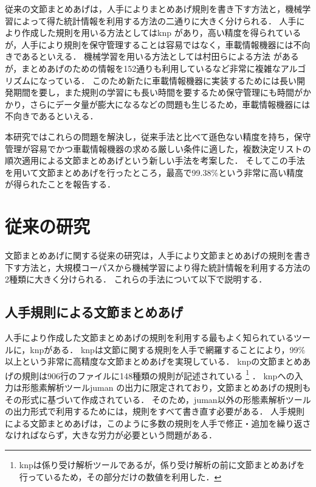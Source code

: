 従来の文節まとめあげは，人手によりまとめあげ規則を書き下す方法と，機械学習によって得た統計情報を利用する方法の二通りに大きく分けられる．
人手により作成した規則を用いる方法としてはknp
\cite{knp2.0b4}
があり，高い精度を得られているが，人手により規則を保守管理することは容易ではなく，車載情報機器には不向きであるといえる．
機械学習を用いる方法としては村田らによる方法
\cite{Murata2000}
があるが，まとめあげのための情報を152通りも利用しているなど非常に複雑なアルゴリズムになっている．
このため新たに車載情報機器に実装するためには長い開発期間を要し，また規則の学習にも長い時間を要するため保守管理にも時間がかかり，さらにデータ量が膨大になるなどの問題も生じるため，車載情報機器には不向きであるといえる．

本研究ではこれらの問題を解決し，従来手法と比べて遜色ない精度を持ち，保守管理が容易でかつ車載情報機器の求める厳しい条件に適した，複数決定リストの順次適用による文節まとめあげという新しい手法を考案した．
そしてこの手法を用いて文節まとめあげを行ったところ，最高で99.38\%という非常に高い精度が得られたことを報告する．



\section{従来の研究}\label{sec:従来の研究}

文節まとめあげに関する従来の研究は，人手により文節まとめあげの規則を書き下す方法と，大規模コーパスから機械学習により得た統計情報を利用する方法の2種類に大きく分けられる．
これらの手法について以下で説明する．


\subsection{人手規則による文節まとめあげ}

人手により作成した文節まとめあげの規則を利用する最もよく知られているツールに，knpがある．
knpは文節に関する規則を人手で網羅することにより，99\%以上という非常に高精度な文節まとめあげを実現している．
knpの文節まとめあげの規則は906行のファイルに148種類の規則が記述されている
\footnote{
  knpは係り受け解析ツールであるが，係り受け解析の前に文節まとめあげを行っているため，その部分だけの数値を利用した．
  }
．
knpへの入力は形態素解析ツールjuman
\cite{juman3.5}
の出力に限定されており，文節まとめあげの規則もその形式に基づいて作成されている．
そのため，juman以外の形態素解析ツールの出力形式で利用するためには，規則をすべて書き直す必要がある．
人手規則による文節まとめあげは，このように多数の規則を人手で修正・追加を繰り返さなければならず，大きな労力が必要という問題がある．

